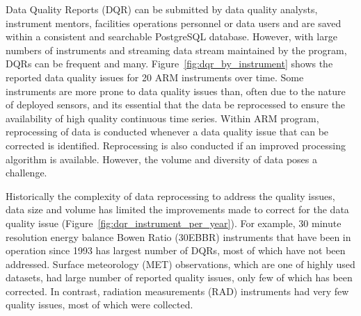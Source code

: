 Data Quality Reports (DQR) can be submitted by data quality analysts,
instrument mentors, facilities operations personnel or data users and
are saved within a consistent and searchable PostgreSQL database.
However, with large numbers of instruments and streaming data stream
maintained by the program, DQRs can be frequent and many. 
Figure~\ref{fig:dqr_by_instrument} shows the reported data quality
issues for 20 ARM instruments over time. Some instruments are more prone
to data quality issues than, often due to the nature of deployed
sensors, and its essential that the data be reprocessed to ensure the
availability of high quality continuous time series. Within ARM program,
reprocessing of data is conducted whenever a data quality issue that can
be corrected is identified. Reprocessing is also conducted if an
improved processing algorithm is available. However, the volume and
diversity of data poses a challenge.

Historically the complexity of data reprocessing to address the quality
issues, data size and volume has limited the improvements made to
correct for the data quality issue
(Figure~\ref{fig:dqr_instrument_per_year}). For example, 30 minute
resolution energy balance Bowen Ratio (30EBBR)
instruments that have been in operation since 1993 has largest number of
DQRs, most of which have not been addressed. Surface meteorology (MET)
observations, which are one of highly used datasets, had large number of
reported quality issues, only few of which has been corrected. In
contrast, radiation measurements (RAD) instruments had very few quality
issues, most of which were collected. 

